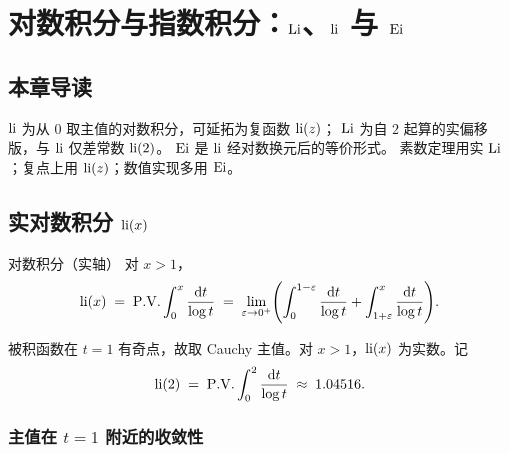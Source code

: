 \chapter{对数积分与指数积分：\texorpdfstring{$\operatorname{Li}$}{Li}、\texorpdfstring{$\operatorname{li}$}{li} 与 \texorpdfstring{$\operatorname{Ei}$}{Ei}}\label{ch:logint_Ei}
\label{ch:Li_li_Ei}

\section*{本章导读}

\(\operatorname{li}\) 为从 $0$ 取主值的对数积分，可延拓为复函数 \(\operatorname{li}(z)\)；
\(\operatorname{Li}\) 为自 $2$ 起算的实偏移版，与 \(\operatorname{li}\) 仅差常数 \(\operatorname{li}(2)\)。
\(\operatorname{Ei}\) 是 \(\operatorname{li}\) 经对数换元后的等价形式。
素数定理用实 \(\operatorname{Li}\)；复点上用 \(\operatorname{li}(z)\)；数值实现多用 \(\operatorname{Ei}\)。

\section{实对数积分 \texorpdfstring{$\operatorname{li}(x)$}{li(x)}}
\label{sec:Li-li-summary}

\begin{definition}{对数积分（实轴）}{}
\label{def:li-real}
对 $x>1$，
\begin{equation}
  \operatorname{li}(x)
  \;=\;
  \mathrm{P.V.}\int_0^x \frac{\mathrm{d}t}{\log t}
  \;=\;
  \lim_{\varepsilon\to 0^+}
  \Biggl(
    \int_0^{1-\varepsilon}\frac{\mathrm{d}t}{\log t}
    +\int_{1+\varepsilon}^{x}\frac{\mathrm{d}t}{\log t}
  \Biggr).
  \label{eq:li-def-ch2}
\end{equation}
\end{definition}

被积函数在 $t=1$ 有奇点，故取 Cauchy 主值。对 $x>1$，$\operatorname{li}(x)$ 为实数。记
\begin{equation}
  \operatorname{li}(2)
  \;=\;
  \mathrm{P.V.}\int_0^2\frac{\mathrm{d}t}{\log t}
  \;\approx\;
  1.04516.
  \label{eq:li-of-two}
\end{equation}

\subsection{主值在 \texorpdfstring{$t=1$}{t=1} 附近的收敛性}

